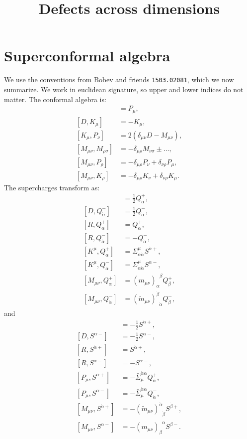 \documentclass[letterpaper]{article}
\title{Defects across dimensions}
\author{}
\let\Oldsection\section
\renewcommand{\section}{\FloatBarrier\Oldsection}
\def\a{{\alpha}}
\def\b{{\beta}}
\def\ad{{\dot{\alpha}}}
\def\bd{{\dot{\beta}}}
\def\ph{\phantom}
\def \ph{\phantom}
\begin{document}
\maketitle
\tableofcontents

\section{Superconformal algebra}

We use the conventions from Bobev and friends \texttt{1503.02081}, which we now summarize.
We work in euclidean signature, so upper and lower indices do not matter.
The conformal algebra is:
\begin{align}
 [ D, P_\mu] & =   P_\mu, \\
 [ D, K_\mu] & = - K_\mu, \\
 [ K_\mu, P_\nu] & = 2 \left( \delta_{\mu\nu} D - M_{\mu\nu} \right), \\
 [ M_{\mu\nu}, M_{\rho\sigma} ] & = -\delta_{\mu\rho} M_{\nu\sigma} \pm \ldots, \\
 [ M_{\mu\nu}, P_\rho] & = - \delta_{\mu\rho} P_\nu + \delta_{\nu\rho} P_\mu, \\
 [ M_{\mu\nu}, K_\rho] & = - \delta_{\mu\rho} K_\nu + \delta_{\nu\rho} K_\mu.
\end{align}
The supercharges transform as:
\begin{align}
 [D, Q^+_\a ] & = \tfrac{1}{2} Q^+_\a, \\
 [D, Q^-_\ad] & = \tfrac{1}{2} Q^-_\ad, \\
 [R, Q^+_\a ] & =  Q^+_\a, \\
 [R, Q^-_\ad] & = -Q^-_\ad, \\
 [K^\mu, Q^+_\a]  & = \Sigma^\mu_{\a\ad} S^{\ad +}, \\
 [K^\mu, Q^-_\ad] & = \Sigma^\mu_{\a\ad} S^{\a  -}, \\
 [M_{\mu\nu}, Q^+_\a]  & = (       m_{\mu\nu})_\a^{\ph \a\b}    Q^{+}_\b, \\
 [M_{\mu\nu}, Q^-_\ad] & = (\tilde m_{\mu\nu})^\bd_{\ph \bd\ad} Q^{-}_\bd,
\end{align}
and
\begin{align}
 [D, S^{\ad+} ] & = - \tfrac{1}{2} S^{\ad+}, \\
 [D, S^{\a -} ] & = - \tfrac{1}{2} S^{\a -}, \\
 [R, S^{\ad+} ] & =  S^{\ad+}, \\
 [R, S^{\a -} ] & = -S^{\a -}, \\
 [P_\mu, S^{\ad+}] & = - \bar \Sigma_\mu^{\ad\a} Q^+_\a, \\
 [P_\mu, S^{\a -}] & = - \bar \Sigma_\mu^{\ad\a} Q^-_\ad, \\
 [M_{\mu\nu}, S^{\ad+}] & = - (\tilde m_{\mu\nu})^\ad_{\ph \ad\bd} S^{\bd+}, \\
 [M_{\mu\nu}, S^{\a -}] & = - (       m_{\mu\nu})_\b ^{\ph \b\a}   S^{\b-}.
\end{align}
\end{document}
